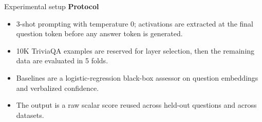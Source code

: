 \documentclass[final]{beamer}
\newlength{\maincolwidth}
\begin{document}
\begin{frame}[t]
\begin{columns}[t]
\begin{column}{\maincolwidth}
\begin{block}{Experimental setup}
\vspace{0.6ex}
\textbf{Protocol}\\[0.2ex]
\begin{itemize}
\item 3-shot prompting with temperature 0; activations are extracted at the final question token before any answer token is generated.
\item 10K TriviaQA examples are reserved for layer selection, then the remaining data are evaluated in 5 folds.
\item Baselines are a logistic-regression black-box assessor on question embeddings and verbalized confidence.
\item The output is a raw scalar score reused across held-out questions and across datasets.
\end{itemize}
\end{block}


\end{column}
\end{columns}
\end{frame}
\end{document}

